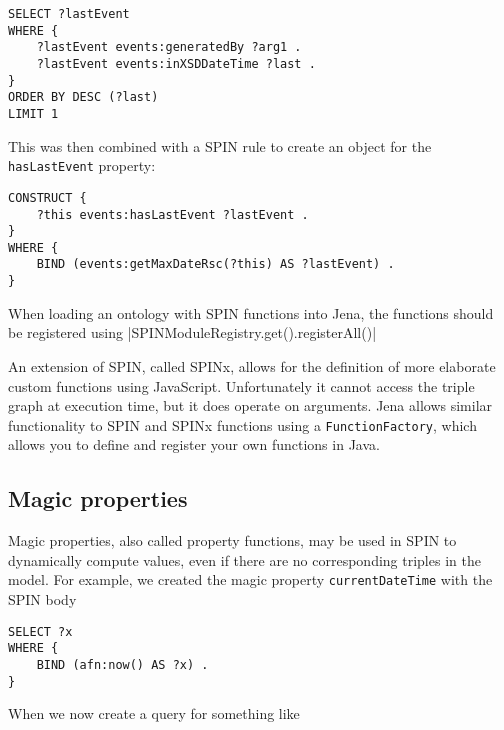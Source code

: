 \begin{verbatim}
SELECT ?lastEvent
WHERE {
    ?lastEvent events:generatedBy ?arg1 .
    ?lastEvent events:inXSDDateTime ?last .
}
ORDER BY DESC (?last)
LIMIT 1
\end{verbatim}

This was then combined with a \ac{SPIN} rule to create an object for the \texttt{hasLastEvent} property:

\begin{verbatim}
CONSTRUCT {
    ?this events:hasLastEvent ?lastEvent .
}
WHERE {
    BIND (events:getMaxDateRsc(?this) AS ?lastEvent) .
}
\end{verbatim}


When loading an ontology with SPIN functions into Jena, the functions should be registered using |SPINModuleRegistry.get().registerAll()|

An extension of \ac{SPIN}, called SPINx, allows for the definition of more elaborate custom functions using JavaScript. Unfortunately it cannot access the triple graph at execution time, but it does operate on arguments. Jena allows similar functionality to \ac{SPIN} and SPINx functions using a \texttt{FunctionFactory}, which allows you to define and register your own functions in Java.

\subsection{Magic properties}
\label{magicproperties}
Magic properties, also called property functions, may be used in \ac{SPIN} to dynamically compute values, even if there are no corresponding triples in the model. For example, we created the magic property \texttt{currentDateTime} with the \ac{SPIN} body


\begin{verbatim}
SELECT ?x
WHERE {
    BIND (afn:now() AS ?x) .
}
\end{verbatim}

When we now create a query for something like 

